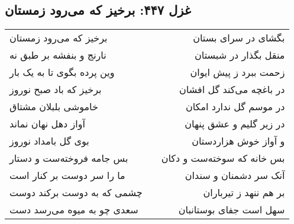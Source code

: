 \begin{center}
\section*{غزل ۴۴۷: برخیز که می‌رود زمستان}
\label{sec:447}
\begin{longtable}{l p{0.5cm} r}
برخیز که می‌رود زمستان
&&
بگشای در سرای بستان
\\
نارنج و بنفشه بر طبق نه
&&
منقل بگذار در شبستان
\\
وین پرده بگوی تا به یک بار
&&
زحمت ببرد ز پیش ایوان
\\
برخیز که باد صبح نوروز
&&
در باغچه می‌کند گل افشان
\\
خاموشی بلبلان مشتاق
&&
در موسم گل ندارد امکان
\\
آواز دهل نهان نماند
&&
در زیر گلیم و عشق پنهان
\\
بوی گل بامداد نوروز
&&
و آواز خوش هزاردستان
\\
بس جامه فروخته‌ست و دستار
&&
بس خانه که سوخته‌ست و دکان
\\
ما را سر دوست بر کنار است
&&
آنک سر دشمنان و سندان
\\
چشمی که به دوست برکند دوست
&&
بر هم ننهد ز تیرباران
\\
سعدی چو به میوه می‌رسد دست
&&
سهل است جفای بوستانبان
\\
\end{longtable}
\end{center}
